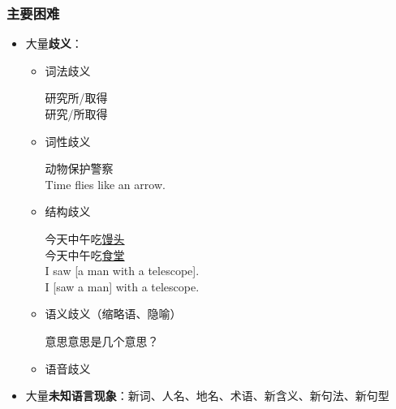 \subsubsection{主要困难}
\begin{itemize}
	\item 大量\textbf{歧义}：
	\begin{itemize}
		\item 词法歧义
		\begin{displayquote}
		研究所/取得\\
		研究/所取得
		\end{displayquote}
		\item 词性歧义
		\begin{displayquote}
		动物保护警察\\
		Time flies like an arrow.
		\end{displayquote}
		\item 结构歧义
		\begin{displayquote}
		今天中午吃\underline{馒头}\\
		今天中午吃\underline{食堂}\\
		I saw [a man with a telescope].\\
		I [saw a man] with a telescope.
		\end{displayquote}
		\item 语义歧义（缩略语、隐喻）
		\begin{displayquote}
		意思意思是几个意思？
		\end{displayquote}
		\item 语音歧义
	\end{itemize}
	\item 大量\textbf{未知语言现象}：新词、人名、地名、术语、新含义、新句法、新句型
\end{itemize}

